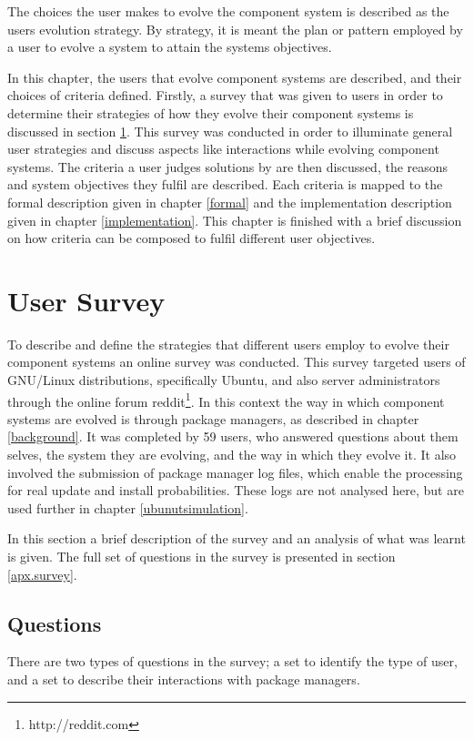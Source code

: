 The choices the user makes to evolve the component system is described as the users evolution strategy.
By strategy, it is meant the plan or pattern employed by a user to evolve a system to attain the systems objectives.

In this chapter, the users that evolve component systems are described, and their choices of criteria defined.
Firstly, a survey that was given to users in order to determine their strategies of how they evolve their component systems is discussed in section \ref{strat.usersurvey}.
This survey was conducted in order to illuminate general user strategies and discuss aspects like interactions while evolving component systems.
The criteria a user judges solutions by are then discussed, the reasons and system objectives they fulfil are described.
Each criteria is mapped to the formal description given in chapter \ref{formal} and the implementation description given in chapter \ref{implementation}.
This chapter is finished with a brief discussion on how criteria can be composed to fulfil different user objectives. 

\section{User Survey}
\label{strat.usersurvey}
To describe and define the strategies that different users employ to evolve their component systems an online survey was conducted.
This survey targeted users of GNU/Linux distributions, specifically Ubuntu, and also server administrators through the online forum reddit\footnote{http://reddit.com}.
In this context the way in which component systems are evolved is through package managers, as described in chapter \ref{background}.
It was completed by 59 users, who answered questions about them selves, the system they are evolving, and the way in which they evolve it.
It also involved the submission of package manager log files, which enable the processing for real update and install probabilities.
These logs are not analysed here, but are used further in chapter \ref{ubunutsimulation}.

In this section a brief description of the survey and an analysis of what was learnt is given.
The full set of questions in the survey is presented in section \ref{apx.survey}. 

\subsection{Questions}
There are two types of questions in the survey; a set to identify the type of user, and a set to describe their interactions with package managers.

